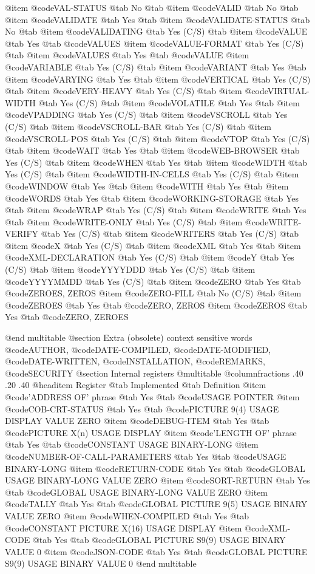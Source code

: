 @item @code{VAL-STATUS} @tab No @tab
@item @code{VALID} @tab No @tab
@item @code{VALIDATE} @tab Yes @tab
@item @code{VALIDATE-STATUS} @tab No @tab
@item @code{VALIDATING} @tab Yes	(C/S) @tab
@item @code{VALUE} @tab Yes @tab @code{VALUES}
@item @code{VALUE-FORMAT} @tab Yes	(C/S) @tab
@item @code{VALUES} @tab Yes @tab @code{VALUE}
@item @code{VARIABLE} @tab Yes	(C/S) @tab
@item @code{VARIANT} @tab Yes @tab
@item @code{VARYING} @tab Yes @tab
@item @code{VERTICAL} @tab Yes	(C/S) @tab
@item @code{VERY-HEAVY} @tab Yes	(C/S) @tab
@item @code{VIRTUAL-WIDTH} @tab Yes	(C/S) @tab
@item @code{VOLATILE} @tab Yes @tab
@item @code{VPADDING} @tab Yes	(C/S) @tab
@item @code{VSCROLL} @tab Yes	(C/S) @tab
@item @code{VSCROLL-BAR} @tab Yes	(C/S) @tab
@item @code{VSCROLL-POS} @tab Yes	(C/S) @tab
@item @code{VTOP} @tab Yes	(C/S) @tab
@item @code{WAIT} @tab Yes @tab
@item @code{WEB-BROWSER} @tab Yes	(C/S) @tab
@item @code{WHEN} @tab Yes @tab
@item @code{WIDTH} @tab Yes	(C/S) @tab
@item @code{WIDTH-IN-CELLS} @tab Yes	(C/S) @tab
@item @code{WINDOW} @tab Yes @tab
@item @code{WITH} @tab Yes @tab
@item @code{WORDS} @tab Yes @tab
@item @code{WORKING-STORAGE} @tab Yes @tab
@item @code{WRAP} @tab Yes	(C/S) @tab
@item @code{WRITE} @tab Yes @tab
@item @code{WRITE-ONLY} @tab Yes (C/S) @tab
@item @code{WRITE-VERIFY} @tab Yes (C/S) @tab
@item @code{WRITERS} @tab Yes	(C/S) @tab
@item @code{X} @tab Yes	(C/S) @tab
@item @code{XML} @tab Yes @tab
@item @code{XML-DECLARATION} @tab Yes	(C/S) @tab
@item @code{Y} @tab Yes	(C/S) @tab
@item @code{YYYYDDD} @tab Yes	(C/S) @tab
@item @code{YYYYMMDD} @tab Yes	(C/S) @tab
@item @code{ZERO} @tab Yes @tab @code{ZEROES, ZEROS}
@item @code{ZERO-FILL} @tab No	(C/S) @tab
@item @code{ZEROES} @tab Yes @tab @code{ZERO, ZEROS}
@item @code{ZEROS} @tab Yes @tab @code{ZERO, ZEROES}


@end multitable
@section Extra (obsolete) context sensitive words
@code{AUTHOR}, @code{DATE-COMPILED}, @code{DATE-MODIFIED}, @code{DATE-WRITTEN}, @code{INSTALLATION}, @code{REMARKS}, @code{SECURITY}
@section Internal registers
@multitable @columnfractions .40 .20 .40
@headitem Register @tab Implemented @tab Definition
@item @code{'ADDRESS OF' phrase} @tab Yes @tab @code{USAGE POINTER}
@item @code{COB-CRT-STATUS} @tab Yes @tab @code{PICTURE 9(4) USAGE DISPLAY VALUE ZERO}
@item @code{DEBUG-ITEM} @tab Yes @tab @code{PICTURE X(n) USAGE DISPLAY}
@item @code{'LENGTH OF' phrase} @tab Yes @tab @code{CONSTANT USAGE BINARY-LONG}
@item @code{NUMBER-OF-CALL-PARAMETERS} @tab Yes @tab @code{USAGE BINARY-LONG}
@item @code{RETURN-CODE} @tab Yes @tab @code{GLOBAL USAGE BINARY-LONG VALUE ZERO}
@item @code{SORT-RETURN} @tab Yes @tab @code{GLOBAL USAGE BINARY-LONG VALUE ZERO}
@item @code{TALLY} @tab Yes @tab @code{GLOBAL PICTURE 9(5) USAGE BINARY VALUE ZERO}
@item @code{WHEN-COMPILED} @tab Yes @tab @code{CONSTANT PICTURE X(16) USAGE DISPLAY}
@item @code{XML-CODE} @tab Yes @tab @code{GLOBAL PICTURE S9(9) USAGE BINARY VALUE 0}
@item @code{JSON-CODE} @tab Yes @tab @code{GLOBAL PICTURE S9(9) USAGE BINARY VALUE 0}
@end multitable
